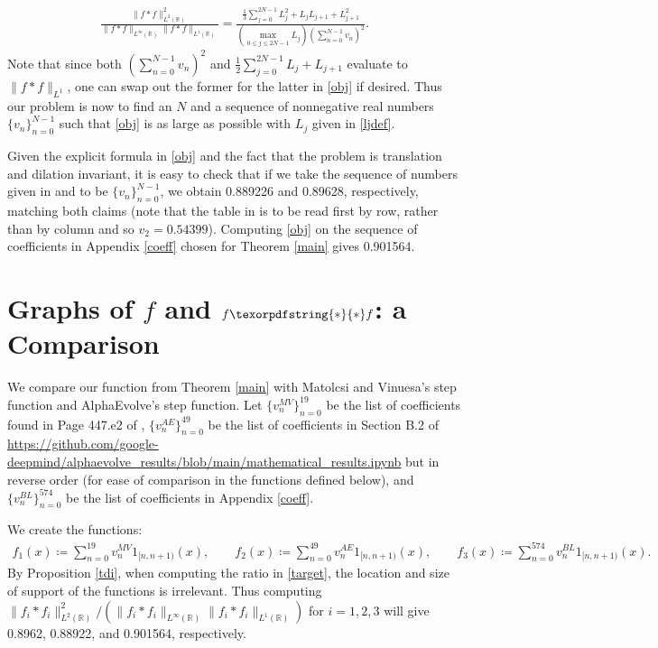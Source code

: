 \documentclass[reqno, 11pt]{amsart}
\newcommand{\R}[0]{\mathbb{R}}
\newcommand{\nms}[1]{\| #1 \|}
\theoremstyle{remark}
\begin{document}
\begin{align}\label{obj}
\frac{\nms{f \ast f}_{L^{2}(\R)}^{2}}{\nms{f \ast f}_{L^{\infty}(\R)}\nms{f \ast f}_{L^{1}(\R)}} = \frac{\frac{1}{3}\sum_{j = 0}^{2N - 1}L_{j}^{2} + L_{j}L_{j + 1} + L_{j + 1}^{2}}{(\max_{0 \leq j \leq 2N - 1}L_j)(\sum_{n = 0}^{N - 1}v_n)^{2}}.
\end{align}
Note that since both $(\sum_{n = 0}^{N - 1}v_n)^{2}$ and $\frac{1}{2}\sum_{j = 0}^{2N - 1}L_{j} + L_{j + 1}$ evaluate to
$\nms{f \ast f}_{L^{1}}$, one can swap out the former for the latter in \eqref{obj} if desired.
Thus our problem is now to find an $N$ and a sequence
of nonnegative real numbers $\{v_n\}_{n = 0}^{N - 1}$ such that \eqref{obj} is as large as possible with $L_j$ given in \eqref{ljdef}.

Given the explicit formula in \eqref{obj} and the fact
that the problem is translation and dilation invariant,
it is easy to check that if we take the sequence of
numbers given in \cite{MatolcsiVinuesa} and \cite{AlphaEvolve} to be $\{v_{n}\}_{n = 0}^{N - 1}$, we obtain 0.889226 and 0.89628, respectively, matching both claims (note that the table in \cite{MatolcsiVinuesa} is to be read first by row, rather than by column and so $v_2 = 0.54399$).
Computing \eqref{obj} on the sequence of coefficients in Appendix \ref{coeff} chosen for Theorem \ref{main} gives 0.901564.

\section{Graphs of $f$ and $f \texorpdfstring{\ast}{*} f$: a Comparison}\label{graphs}
We compare our function from Theorem \ref{main} with Matolcsi and Vinuesa's step function and AlphaEvolve's step function.
Let $\{v_{n}^{MV}\}_{n = 0}^{19}$ be the list of coefficients found in Page 447.e2 of \cite[Appendix A]{MatolcsiVinuesa}, $\{v_{n}^{AE}\}_{n = 0}^{49}$ be the list of coefficients in Section B.2 of \url{https://github.com/google-deepmind/alphaevolve_results/blob/main/mathematical_results.ipynb} but in reverse order (for ease of comparison in the functions defined below),
and $\{v_{n}^{BL}\}_{n = 0}^{574}$ be the list of coefficients in Appendix \ref{coeff}.

We create the functions:
\begin{align*}
f_{1}(x) \coloneqq \sum_{n = 0}^{19}v_{n}^{MV}1_{[n, n + 1)}(x), \quad\quad f_{2}(x) \coloneqq \sum_{n = 0}^{49}v_{n}^{AE}1_{[n, n + 1)}(x), \quad\quad f_{3}(x) \coloneqq \sum_{n = 0}^{574}v_{n}^{BL}1_{[n, n + 1)}(x).
\end{align*}
By Proposition \ref{tdi}, when computing the ratio in \eqref{target}, the location and size
of support of the functions is irrelevant. Thus computing $\nms{f_{i} \ast f_{i}}_{L^{2}(\R)}^{2}/(\nms{f_i \ast f_i}_{L^{\infty}(\R)}\nms{f_i \ast f_i}_{L^{1}(\R)})$ for $i = 1, 2, 3$ will give
0.8962, 0.88922, and 0.901564, respectively.
\end{document}
